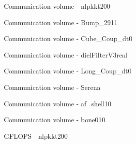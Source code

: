 \begin{figure}[H]
    \centering
    \caption{Communication volume - nlpkkt200}
    \label{fig:nlpkkt200_commload_multi_rome16q}
\end{figure}

\begin{figure}[H]
    \centering
    \caption{Communication volume - Bump\_2911}
    \label{fig:Bump_2911_commload_multi_rome16q}
\end{figure}

\begin{figure}[H]
    \centering
    \caption{Communication volume - Cube\_Coup\_dt0}
    \label{fig:Cube_Coup_dt0_commload_multi_rome16q}
\end{figure}

\begin{figure}[H]
    \centering
    \caption{Communication volume - dielFilterV3real}
    \label{fig:dielFilterV3real_commload_multi_rome16q}
\end{figure}

\begin{figure}[H]
    \centering
    \caption{Communication volume - Long\_Coup\_dt0}
    \label{fig:Long_Coup_dt0_commload_multi_rome16q}
\end{figure}

\begin{figure}[H]
    \centering
    \caption{Communication volume - Serena}
    \label{fig:Serena_commload_multi_rome16q}
\end{figure}

\begin{figure}[H]
    \centering
    \caption{Communication volume - af\_shell10}
    \label{fig:af_shell10_commload_multi_rome16q}
\end{figure}

\begin{figure}[H]
    \centering
    \caption{Communication volume - bone010}
    \label{fig:bone010_commload_multi_rome16q}
\end{figure}

\begin{figure}[H]
    \centering
    \caption{GFLOPS - nlpkkt200}
    \label{fig:nlpkkt200_gflops_multi_rome16q}
\end{figure}

